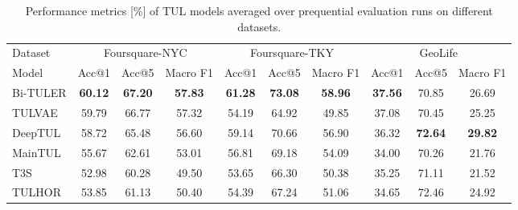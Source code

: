 \documentclass{article} %
\theoremstyle{definition}
\begin{document}
\begin{table}[h]
    \caption{Performance metrics [\%] of TUL models averaged over prequential evaluation runs on different datasets.}
    \label{tab:models}
    \begin{tabular}{lccccccccc}
        \toprule
        Dataset  & \multicolumn{3}{c}{Foursquare-NYC} & \multicolumn{3}{c}{Foursquare-TKY} & \multicolumn{3}{c}{GeoLife}                                                                                                             \\
        \cmidrule(lr){2-4} \cmidrule(lr){5-7} \cmidrule(lr){8-10}
        Model    & Acc@1                              & Acc@5                              & Macro F1                    & Acc@1           & Acc@5           & Macro F1        & Acc@1           & Acc@5           & Macro F1        \\
        \midrule
        Bi-TULER & \bfseries 60.12                    & \bfseries 67.20                    & \bfseries 57.83             & \bfseries 61.28 & \bfseries 73.08 & \bfseries 58.96 & \bfseries 37.56 & 70.85           & 26.69           \\
        TULVAE   & 59.79                              & 66.77                              & 57.32                       & 54.19           & 64.92           & 49.85           & 37.08           & 70.45           & 25.25           \\
        DeepTUL  & 58.72                              & 65.48                              & 56.60                       & 59.14           & 70.66           & 56.90           & 36.32           & \bfseries 72.64 & \bfseries 29.82 \\
        MainTUL  & 55.67                              & 62.61                              & 53.01                       & 56.81           & 69.18           & 54.09           & 34.00           & 70.26           & 21.76           \\
        T3S      & 52.98                              & 60.28                              & 49.50                       & 53.65           & 66.30           & 50.38           & 35.25           & 71.11           & 21.52           \\
        TULHOR   & 53.85                              & 61.13                              & 50.40                       & 54.39           & 67.24           & 51.06           & 34.65           & 72.46           & 24.92           \\
        \bottomrule
    \end{tabular}
\end{table}
\end{document}
